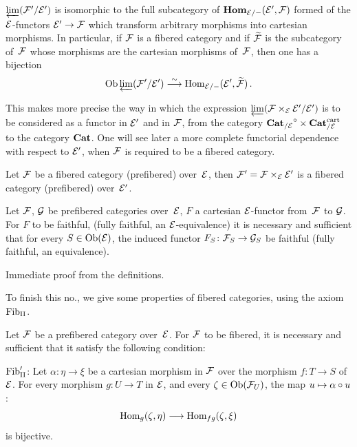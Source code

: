 \begin{corollary}
\label{VI.6.8}
$\varprojLim(\cal{F}'/\cal{E}')$ is isomorphic to
the full subcategory of
$\SheafHom_{\cal{E}/-}(\cal{E}',\cal{F})$ formed of the
$\cal{E}$-functors $\cal{E}'\to\cal{F}$ which transform arbitrary
morphisms into cartesian morphisms. In particular, if $\cal{F}$
is a fibered category and if $\tilde{\cal{F}}$ is the
subcategory of~$\cal{F}$ whose morphisms are the
cartesian morphisms of~$\cal{F}$, then one has a bijection
$$
\Ob \varprojLim(\cal{F}'/\cal{E}') \isomto
\Hom_{\cal{E}/-}(\cal{E}',\tilde{\cal{F}})\,.
$$
\end{corollary}

This makes more precise the way in which the expression
$\varprojLim(\cal{F} \times_{\cal{E}} \cal{E}' /
\cal{E}')$ is to be considered as a functor in
$\cal{E}'$ and in $\cal{F}$, from the category
${\Cat_{/\cal{E}}}^\circ \times \Cat^\cart_{/\cal{E}}$ to the
category $\Cat$. One will see later a more complete
functorial dependence with respect to $\cal{E}'$, when
$\cal{F}$ is required to be a fibered category.

\begin{corollary}
\label{VI.6.9}
Let $\cal{F}$ be a fibered category (\resp prefibered)
over~$\cal{E}$, then $\cal{F}'=\cal{F}\times_{\cal{E}}\cal{E}'$ is
a fibered category (\resp prefibered) over~$\cal{E}'$.
\end{corollary}

\begin{proposition}
\label{VI.6.10} Let $\cal{F}$, $\cal{G}$ be
prefibered categories over~$\cal{E}$, $F$ a cartesian $\cal{E}$-functor
from~$\cal{F}$ to $\cal{G}$. For $F$ to be
faithful,
(\resp fully faithful, \resp an $\cal{E}$-equivalence)
it is necessary and sufficient that for every
$S\in \Ob(\cal{E})$,
the induced functor $F_S\colon \cal{F}_S\to \cal{G}_S$ be
faithful (\resp fully faithful, \resp an equivalence).
\end{proposition}

Immediate proof from the definitions.

To finish this no., we give some properties of
fibered categories, using the axiom $\Fib_{\mathrm{II}}$.
\begin{proposition}
\label{VI.6.11} Let $\cal{F}$ be a prefibered category
over~$\cal{E}$. For $\cal{F}$ to be fibered, it is necessary and
sufficient that it satisfy the following condition:

$\Fib_{\mathrm{II}}'$: Let $\alpha\colon\eta\to\xi$ be a
cartesian morphism in $\cal{F}$ over the morphism $f\colon T\to S$
of~$\cal{E}$. For every morphism $g\colon U\to T$ in $\cal{E}$, and
every
$\zeta\in\Ob(\cal{F}_U)$,
the map $u\mto\alpha\circ u$:
$$
\Hom_g(\zeta,\eta)\to\Hom_{fg}(\zeta,\xi)
$$
is bijective.
\end{proposition}

